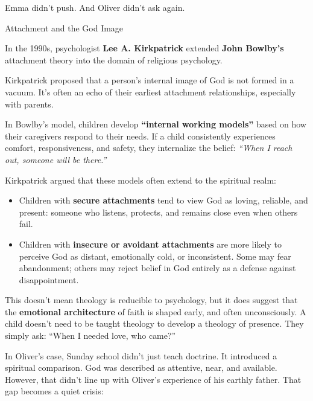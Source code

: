 Emma didn’t push.  
And Oliver didn’t ask again.

\medskip

\begin{PsychologicalSidebar}{Attachment and the God Image}

    In the 1990s, psychologist \textbf{Lee A. Kirkpatrick} extended \textbf{John Bowlby’s} attachment 
    theory into the domain of religious psychology.
    
    \medskip
    
    Kirkpatrick proposed that a person’s internal image of God is not formed in a vacuum. It’s often an 
    echo of their earliest attachment relationships, especially with parents.
    
    \medskip
    
    In Bowlby’s model, children develop \textbf{“internal working models”} based on how their caregivers 
    respond to their needs. If a child consistently experiences comfort, responsiveness, and safety, they 
    internalize the belief: \textit{``When I reach out, someone will be there.''}
    
    \medskip
    
    Kirkpatrick argued that these models often extend to the spiritual realm:

    \medskip
    
    \begin{itemize}
      \item Children with \textbf{secure attachments} tend to view God as loving, reliable, and present: 
      someone who listens, protects, and remains close even when others fail.
      \item Children with \textbf{insecure or avoidant attachments} are more likely to perceive God as 
      distant, emotionally cold, or inconsistent. Some may fear abandonment; others may reject belief in 
      God entirely as a defense against disappointment.
    \end{itemize}
    
    \medskip
    
    This doesn’t mean theology is reducible to psychology, but it does suggest that the \textbf{emotional 
    architecture} of faith is shaped early, and often unconsciously. A child doesn’t need to be taught 
    theology to develop a theology of presence. They simply ask:  
    ``When I needed love, who came?''
    
    \medskip
    
    In Oliver’s case, Sunday school didn’t just teach doctrine. It introduced a spiritual comparison. God 
    was described as attentive, near, and available. However, that didn’t line up with Oliver’s experience 
    of his earthly father. That gap becomes a quiet crisis:
    

\end{PsychologicalSidebar}
